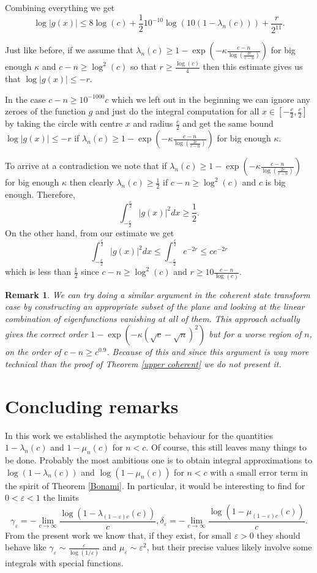 \documentclass[12pt]{amsart}
\numberwithin{equation}{section}
\newcommand{\eps}{\varepsilon}
\newtheorem{remark}[Thm]{Remark}
\begin{document}
Combining everything we get
$$\log |g(x)| \le 8\log(c) + \frac{1}{2}10^{-10}\log(10(1-\lambda_n(c))) + \frac{r}{2^{11}}.$$

Just like before, if we assume that $\lambda_n(c) \ge 1 - \exp\left(-\kappa\frac{c-n}{\log(\frac{2c}{c-n})}\right)$ for big enough $\kappa$ and $c -n \ge \log^2(c)$ so that $r \ge \frac{\log(c)}{4}$ then this estimate gives us that $\log |g(x)| \le -r$.

In the case $c -n\ge 10^{-1000}c$ which we left out in the beginning we can ignore any zeroes of the function $g$ and just do the integral computation for all $x\in [-\frac{c}{2},\frac{c}{2}]$ by taking the circle with centre $x$ and radius $\frac{c}{2}$ and get the same bound $\log |g(x)|\le -r$ if $\lambda_n(c) \ge 1 - \exp\left(-\kappa\frac{c-n}{\log(\frac{2c}{c-n})}\right)$ for big enough $\kappa$.

To arrive at a contradiction we note that if $\lambda_n(c) \ge 1 - \exp\left(-\kappa\frac{c-n}{\log(\frac{2c}{c-n})}\right)$ for big enough $\kappa$ then clearly $\lambda_n(c) \ge \frac{1}{2}$ if $c-n\ge \log^2(c)$ and $c$ is big enough. Therefore,
$$\int_{-\frac{c}{2}}^{\frac{c}{2}}|g(x)|^2dx \ge \frac{1}{2}.$$
On the other hand, from our estimate we get
$$\int_{-\frac{c}{2}}^{\frac{c}{2}}|g(x)|^2dx \le \int_{-\frac{c}{2}}^{\frac{c}{2}}e^{-2r} \le ce^{-2r}$$
which is less than $\frac{1}{2}$ since $c-n\ge \log^2(c)$ and $r\ge 10\frac{c-n}{\log(c)}$.
\begin{remark}\label{UC}
We can try doing a similar argument in the coherent state transform case by constructing an appropriate subset of the plane and looking at the linear combination of eigenfunctions vanishing at all of them. This approach actually gives the correct order $1-\exp(-\kappa(\sqrt{c}-\sqrt{n})^2)$ but for a worse region of $n$, on the order of $c-n\ge c^{0.9}$. Because of this and since this argument is way more technical than the proof of Theorem \ref{upper coherent} we do not present it.
\end{remark}
\section{Concluding remarks}
In this work we established the asymptotic behaviour for the quantities $1-\lambda_n(c)$ and $1-\mu_n(c)$ for $n < c$. Of course, this still leaves many things to be done. Probably the most ambitious one is to obtain integral approximations to $\log(1-\lambda_n(c))$ and $\log(1-\mu_n(c))$ for $n < c$ with a small error term in the spirit of Theorem \ref{Bonami}. In particular, it would be interesting to find for $0 < \eps < 1$ the limits
$$\gamma_\eps = -\lim_{c\to\infty} \frac{\log(1-\lambda_{(1-\eps)c}(c))}{c}, \delta_\eps =-\lim_{c\to\infty} \frac{\log(1-\mu_{(1-\eps)c}(c))}{c}.$$
From the present work we know that, if they exist, for small $\eps > 0$ they should behave like $\gamma_\eps \sim \frac{\eps}{\log(1/\eps)}$ and $\mu_\eps \sim \eps^2$, but their precise values likely involve some integrals with special functions.
\end{document}
